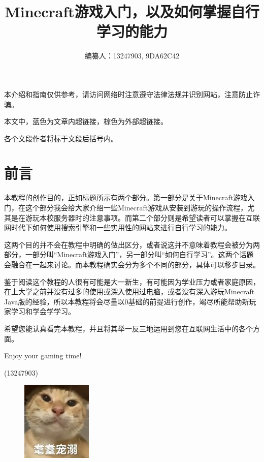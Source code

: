 \documentclass[UTF8,a4paper]{article}
\title{Minecraft游戏入门，以及如何掌握自行学习的能力}
\author{编纂人：13247903, 9DA62C42}
\begin{document}
	\maketitle
	\tableofcontents
	\newpage
	\par 本介绍和指南仅供参考，请访问网络时注意遵守法律法规并识别网站，注意防止诈骗。
	\par 本文中，蓝色为文章内超链接，棕色为外部超链接。
	\par 各个文段作者将标于文段后括号内。

	\section*{前言}
		\par 本教程的创作目的，正如标题所示有两个部分。第一部分是关于Minecraft游戏入门，在这个部分我会给大家介绍一些Minecraft游戏从安装到游玩的操作流程，尤其是在游玩本校服务器时的注意事项。而第二个部分则是希望读者可以掌握在互联网时代下如何使用搜索引擎和一些实用性的网站来进行自行学习的能力。
		\par 这两个目的并不会在教程中明确的做出区分，或者说这并不意味着教程会被分为两部分，一部分叫“Minecraft游戏入门”，另一部分叫“如何自行学习”。这两个话题会融合在一起来讨论。而本教程确实会分为多个不同的部分，具体可以移步目录。
		\par 鉴于阅读这个教程的人很有可能是大一新生，有可能因为学业压力或者家庭原因，在上大学之前并没有过多的使用或深入使用过电脑，或者没有深入游玩Minecraft Java版的经验，所以本教程将会尽量以0基础的前提进行创作，竭尽所能帮助新玩家学习和学会学学习。
		\par 希望您能认真看完本教程，并且将其举一反三地运用到您在互联网生活中的各个方面。
		\par Enjoy your gaming time!
		\begin{flushright}(13247903)\end{flushright}
		\begin{figure}[H] %
			\centering %
			\includegraphics[width=0.3\textwidth]{./Pictures/maodiechongni.png} %
		\end{figure}
\end{document}
